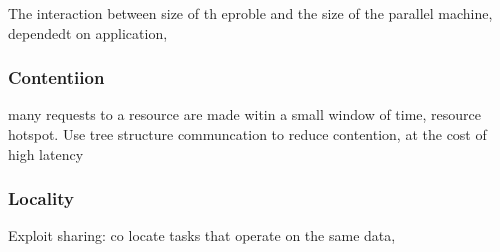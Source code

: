 \documentclass{article}
\begin{document}
The interaction between size of th eproble  and the size of the parallel machine, dependedt on application, 







\subsubsection*{Contentiion}
many requests to a resource are made witin a small window of time, resource hotspot. Use tree structure communcation to reduce contention, at the cost of high latency 
\subsubsection*{Locality}
Exploit sharing: co locate tasks that operate on the same data, 
\end{document}
